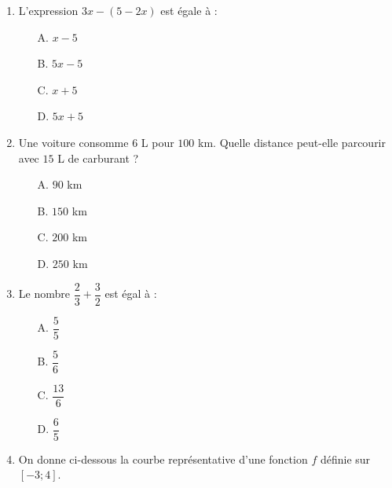 \documentclass[a4paper,12pt]{article}
\begin{document}
\begin{enumerate}

\item L'expression $3x - (5 - 2x)$ est égale à :
\begin{itemize}
\item[A.] $x - 5$
\item[B.] $5x - 5$
\item[C.] $x + 5$
\item[D.] $5x + 5$
\end{itemize}

\item Une voiture consomme $6$ L pour $100$ km. Quelle distance peut-elle parcourir avec $15$ L de carburant ?
\begin{itemize}
\item[A.] $90$ km
\item[B.] $150$ km
\item[C.] $200$ km
\item[D.] $250$ km
\end{itemize}

\item Le nombre $\dfrac{2}{3} + \dfrac{3}{2}$ est égal à :
\begin{itemize}
\item[A.] $\dfrac{5}{5}$
\item[B.] $\dfrac{5}{6}$
\item[C.] $\dfrac{13}{6}$
\item[D.] $\dfrac{6}{5}$
\end{itemize}

\item On donne ci-dessous la courbe représentative d'une fonction $f$ définie sur $[-3;4]$.

\begin{center}
\end{center}


\end{enumerate}
\end{document}
